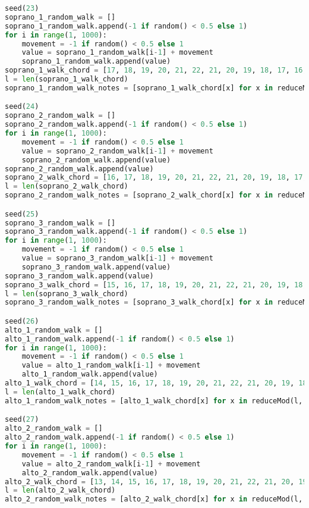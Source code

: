 \begin{lstlisting}[language=Python, caption=Invocation Source Code]
seed(23)
soprano_1_random_walk = []
soprano_1_random_walk.append(-1 if random() < 0.5 else 1)
for i in range(1, 1000):
    movement = -1 if random() < 0.5 else 1
    value = soprano_1_random_walk[i-1] + movement
    soprano_1_random_walk.append(value)
soprano_1_walk_chord = [17, 18, 19, 20, 21, 22, 21, 20, 19, 18, 17, 16, 15, 14, 13, 12, 11, 10, 9, 8, 7, 6, 5, 4, 3, 2, 1, 0, -1, -2, -1, 0, 1, 2, 3, 4, 5, 6, 7, 8, 9, 10, 11, 12, 13, 14, 15, 16, ]
l = len(soprano_1_walk_chord)
soprano_1_random_walk_notes = [soprano_1_walk_chord[x] for x in reduceMod(l, soprano_1_random_walk)]

seed(24)
soprano_2_random_walk = []
soprano_2_random_walk.append(-1 if random() < 0.5 else 1)
for i in range(1, 1000):
    movement = -1 if random() < 0.5 else 1
    value = soprano_2_random_walk[i-1] + movement
    soprano_2_random_walk.append(value)
soprano_2_random_walk.append(value)
soprano_2_walk_chord = [16, 17, 18, 19, 20, 21, 22, 21, 20, 19, 18, 17, 16, 15, 14, 13, 12, 11, 10, 9, 8, 7, 6, 5, 4, 3, 2, 1, 0, -1, -2, -1, 0, 1, 2, 3, 4, 5, 6, 7, 8, 9, 10, 11, 12, 13, 14, 15, ]
l = len(soprano_2_walk_chord)
soprano_2_random_walk_notes = [soprano_2_walk_chord[x] for x in reduceMod(l, soprano_2_random_walk)]

seed(25)
soprano_3_random_walk = []
soprano_3_random_walk.append(-1 if random() < 0.5 else 1)
for i in range(1, 1000):
    movement = -1 if random() < 0.5 else 1
    value = soprano_3_random_walk[i-1] + movement
    soprano_3_random_walk.append(value)
soprano_3_random_walk.append(value)
soprano_3_walk_chord = [15, 16, 17, 18, 19, 20, 21, 22, 21, 20, 19, 18, 17, 16, 15, 14, 13, 12, 11, 10, 9, 8, 7, 6, 5, 4, 3, 2, 1, 0, -1, -2, -1, 0, 1, 2, 3, 4, 5, 6, 7, 8, 9, 10, 11, 12, 13, 14, ]
l = len(soprano_3_walk_chord)
soprano_3_random_walk_notes = [soprano_3_walk_chord[x] for x in reduceMod(l, soprano_3_random_walk)]

seed(26)
alto_1_random_walk = []
alto_1_random_walk.append(-1 if random() < 0.5 else 1)
for i in range(1, 1000):
    movement = -1 if random() < 0.5 else 1
    value = alto_1_random_walk[i-1] + movement
    alto_1_random_walk.append(value)
alto_1_walk_chord = [14, 15, 16, 17, 18, 19, 20, 21, 22, 21, 20, 19, 18, 17, 16, 15, 14, 13, 12, 11, 10, 9, 8, 7, 6, 5, 4, 3, 2, 1, 0, -1, -2, -1, 0, 1, 2, 3, 4, 5, 6, 7, 8, 9, 10, 11, 12, 13, ]
l = len(alto_1_walk_chord)
alto_1_random_walk_notes = [alto_1_walk_chord[x] for x in reduceMod(l, alto_1_random_walk)]

seed(27)
alto_2_random_walk = []
alto_2_random_walk.append(-1 if random() < 0.5 else 1)
for i in range(1, 1000):
    movement = -1 if random() < 0.5 else 1
    value = alto_2_random_walk[i-1] + movement
    alto_2_random_walk.append(value)
alto_2_walk_chord = [13, 14, 15, 16, 17, 18, 19, 20, 21, 22, 21, 20, 19, 18, 17, 16, 15, 14, 13, 12, 11, 10, 9, 8, 7, 6, 5, 4, 3, 2, 1, 0, -1, -2, -1, 0, 1, 2, 3, 4, 5, 6, 7, 8, 9, 10, 11, 12, ]
l = len(alto_2_walk_chord)
alto_2_random_walk_notes = [alto_2_walk_chord[x] for x in reduceMod(l, alto_2_random_walk)]


\end{lstlisting}
